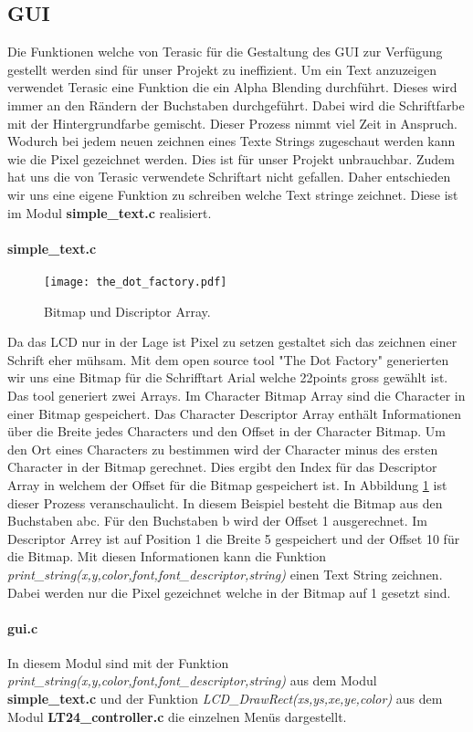 \subsection{GUI}\label{subsec:gui}
Die Funktionen welche von Terasic für die Gestaltung des GUI zur Verfügung gestellt werden sind für unser Projekt zu ineffizient. Um ein Text anzuzeigen verwendet Terasic eine Funktion die ein Alpha Blending durchführt. Dieses wird immer an den Rändern der Buchstaben durchgeführt. Dabei wird die Schriftfarbe mit der Hintergrundfarbe gemischt. Dieser Prozess nimmt viel Zeit in Anspruch. Wodurch bei jedem neuen zeichnen eines Texte Strings zugeschaut werden kann wie die Pixel gezeichnet werden. Dies ist für unser Projekt unbrauchbar. Zudem hat uns die von Terasic verwendete Schriftart nicht gefallen. Daher entschieden wir uns eine eigene Funktion zu schreiben welche Text stringe zeichnet. Diese ist im Modul  \textbf{simple\_text.c} realisiert.

\paragraph{simple\_text.c}
\begin{figure}[h]
	\centering
	\texttt{[image: the\_dot\_factory.pdf]}
	\caption{Bitmap und Discriptor Array.}
	\label{img:bitmap}
\end{figure}
Da das LCD nur in der Lage ist Pixel zu setzen gestaltet sich das zeichnen einer Schrift eher mühsam. Mit dem open source tool "The Dot Factory" generierten wir uns eine Bitmap für die Schrifftart Arial welche 22points gross gewählt ist. Das tool generiert zwei Arrays. Im Character Bitmap Array sind die Character in einer Bitmap gespeichert. Das Character Descriptor Array enthält Informationen über die Breite jedes Characters und den Offset in der Character Bitmap. Um den Ort eines Characters zu bestimmen wird der Character minus des ersten Character in der Bitmap gerechnet.  Dies ergibt den Index für das Descriptor Array in welchem der Offset für die Bitmap gespeichert ist. In Abbildung \ref{img:bitmap} ist dieser Prozess veranschaulicht. In diesem Beispiel besteht die Bitmap aus den Buchstaben abc. Für den Buchstaben b wird der Offset 1 ausgerechnet. Im Descriptor Arrey ist auf Position 1 die Breite 5 gespeichert und der Offset 10 für die Bitmap. Mit diesen Informationen kann die Funktion \textit{print\_string(x,y,color,font,font\_descriptor,string)} einen Text String zeichnen. Dabei werden nur die Pixel gezeichnet welche in der Bitmap auf 1 gesetzt sind.


\paragraph{gui.c}
In diesem Modul sind mit der Funktion \textit{print\_string(x,y,color,font,font\_descriptor,string)} aus dem Modul  \textbf{simple\_text.c} und der Funktion \textit{LCD\_DrawRect(xs,ys,xe,ye,color)} aus dem Modul \textbf{LT24\_controller.c} die einzelnen Menüs dargestellt. 